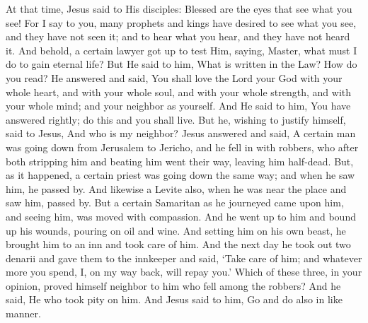{{At that time, Jesus said to His disciples: Blessed are the eyes that see what you see! For I say to you, many prophets and kings have desired to see what you see, and they have not seen it; and to hear what you hear, and they have not heard it. And behold, a certain lawyer got up to test Him, saying, Master, what must I do to gain eternal life? But He said to him, What is written in the Law? How do you read? He answered and said, You shall love the Lord your God with your whole heart, and with your whole soul, and with your whole strength, and with your whole mind; and your neighbor as yourself. And He said to him, You have answered rightly; do this and you shall live. But he, wishing to justify himself, said to Jesus, And who is my neighbor? Jesus answered and said, A certain man was going down from Jerusalem to Jericho, and he fell in with robbers, who after both stripping him and beating him went their way, leaving him half-dead. But, as it happened, a certain priest was going down the same way; and when he saw him, he passed by. And likewise a Levite also, when he was near the place and saw him, passed by. But a certain Samaritan as he journeyed came upon him, and seeing him, was moved with compassion. And he went up to him and bound up his wounds, pouring on oil and wine. And setting him on his own beast, he brought him to an inn and took care of him. And the next day he took out two denarii and gave them to the innkeeper and said, ‘Take care of him; and whatever more you spend, I, on my way back, will repay you.’ Which of these three, in your opinion, proved himself neighbor to him who fell among the robbers? And he said, He who took pity on him. And Jesus said to him, Go and do also in like manner.
  }
}
\newcommand{\offertory}{%
  Precátus est Moyses in conspéctu Dómini, Dei sui, et dixit: Quare, Dómine, irásceris in pópulo tuo? Parce iræ ánimæ tuæ: meménto Abraham, Isaac et Iacob, quibus iurásti dare terram fluéntem lac et mel. Et placátus factus est Dóminus de malignitáte, quam dixit fácere pópulo suo.
}
\newcommand{\offertoryTranslation}{%
  Moses prayed in the sight of the Lord his God and said, Why, O Lord, is Your indignation enkindled against Your people? Let the anger of Your mind cease; remember Abraham, Isaac, and Jacob, to whom You swore to give a land flowing with milk and honey. And the Lord was appeased from doing the evil which He had spoken of doing against His people.
}
\newcommand{\secret}{%
  \l{%
    Hóstias, quǽsumus, Dómine, propítius inténde, quas sacris altáribus exhibémus: ut, nobis indulgéntiam largiéndo, tuo nómini dent honórem.
  }
  \e{%
    O Lord, we beseech You, graciously look upon the offerings which we lay upon Your sacred altar; so that they may bring us plentiful forgiveness while they give honor to Your name.
  }
  \per
}
